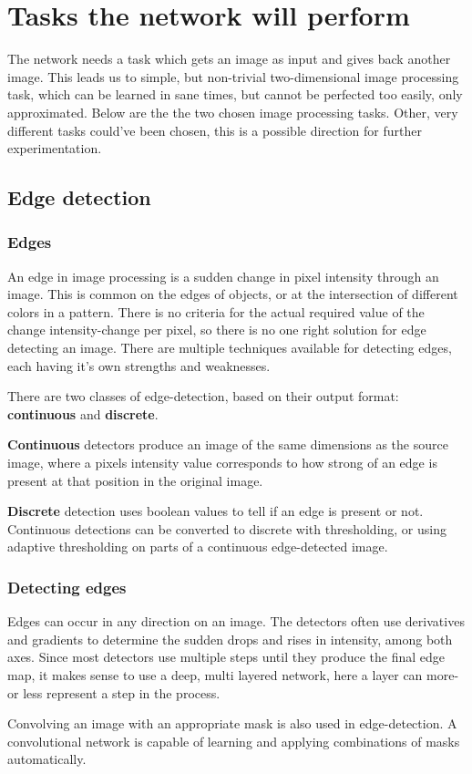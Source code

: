 \documentclass[a4paper,12pt]{article}
\begin{document}
\section{Tasks the network will perform}
The network needs a task which gets an image as input and gives back another image. This leads us to simple, but non-trivial two-dimensional image processing task, which can be learned in sane times, but cannot be perfected too easily, only approximated. Below are the the two chosen image processing tasks. Other, very different tasks could've been chosen, this is a possible direction for further experimentation.
\subsection{Edge detection}
\subsubsection{Edges}
An edge in image processing is a sudden change in pixel intensity through an image. This is common on the edges of objects, or at the intersection of different colors in a pattern. There is no criteria for the actual required value of the change intensity-change per pixel, so there is no one right solution for edge detecting an image. There are multiple techniques available for detecting edges, each having it's own strengths and weaknesses.\par
There are two classes of edge-detection, based on their output format: \textbf{continuous} and \textbf{discrete}.\par
\textbf{Continuous} detectors produce an image of the same dimensions as the source image, where a pixels intensity value corresponds to how strong of an edge is present at that position in the original image.\par
\textbf{Discrete} detection uses boolean values to tell if an edge is present or not. Continuous detections can be converted to discrete with thresholding, or using adaptive thresholding on parts of a continuous edge-detected image.
\subsubsection{Detecting edges}
Edges can occur in any direction on an image. The detectors often use derivatives and gradients to determine the sudden drops and rises in intensity, among both axes. Since most detectors use multiple steps until they produce the final edge map, it makes sense to use a deep, multi layered network, here a layer can more-or less represent a step in the process.\par
Convolving an image with an appropriate mask is also used in edge-detection. A convolutional network is capable of learning and applying combinations of masks automatically.
\end{document}
